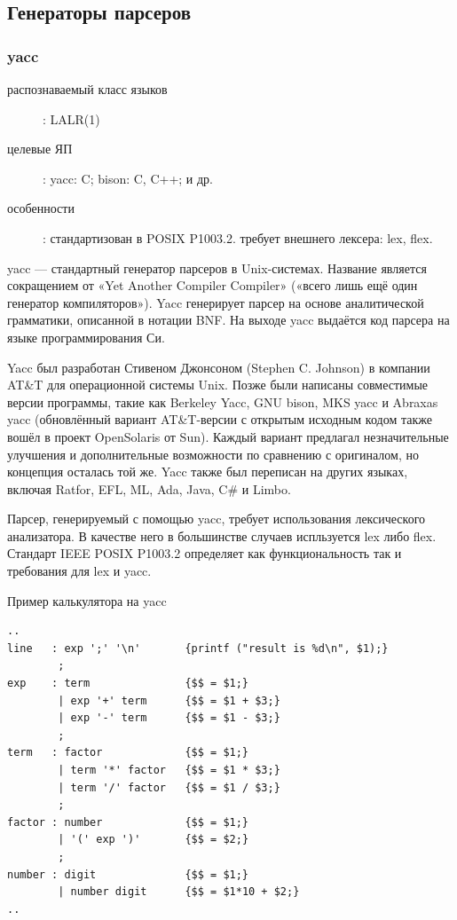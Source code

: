 \documentclass[a4paper,12pt]{article}
\begin{document}
\subsection{Генераторы парсеров}

\subsubsection{yacc}
\begin{description}
  \item[распознаваемый класс языков]: LALR(1)
  \item[целевые ЯП]: yacc: C; bison: C, C++; и др.
  \item[особенности]: стандартизован в POSIX P1003.2. требует внешнего лексера: lex, flex.
\end{description}
yacc — стандартный генератор парсеров в Unix-системах. Название является
сокращением от «Yet Another Compiler Compiler» («всего лишь ещё один генератор
компиляторов»). Yacc генерирует парсер на основе аналитической грамматики,
описанной в нотации BNF. На выходе yacc выдаётся код парсера на языке
программирования Си.

Yacc был разработан Стивеном Джонсоном (Stephen C. Johnson) в компании AT\&T
для операционной системы Unix. Позже были написаны совместимые версии
программы, такие как Berkeley Yacc, GNU bison, MKS yacc и Abraxas yacc
(обновлённый вариант AT\&T-версии с открытым исходным кодом также вошёл в
проект OpenSolaris от Sun). Каждый вариант предлагал незначительные улучшения и
дополнительные возможности по сравнению с оригиналом, но концепция осталась той
же. Yacc также был переписан на других языках, включая Ratfor, EFL, ML, Ada,
Java, C\# и Limbo.

Парсер, генерируемый с помощью yacc, требует использования лексического
анализатора. В качестве него в большинстве случаев испльзуется lex либо
flex. Стандарт IEEE POSIX P1003.2 определяет как функциональность так и
требования для lex и yacc.

\begin{example}
Пример калькулятора на yacc
\end{example}
\begin{verbatim}
..
line   : exp ';' '\n'       {printf ("result is %d\n", $1);}
        ;
exp    : term               {$$ = $1;}
        | exp '+' term      {$$ = $1 + $3;}
        | exp '-' term      {$$ = $1 - $3;}
        ;
term   : factor             {$$ = $1;}
        | term '*' factor   {$$ = $1 * $3;}
        | term '/' factor   {$$ = $1 / $3;}
        ;
factor : number             {$$ = $1;}
        | '(' exp ')'       {$$ = $2;}
        ;
number : digit              {$$ = $1;}
        | number digit      {$$ = $1*10 + $2;}
..
\end{verbatim}
\end{document}
